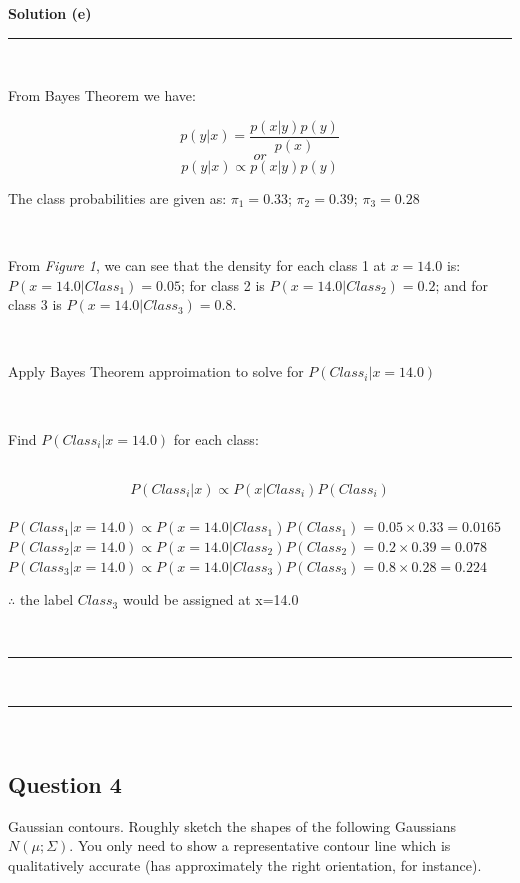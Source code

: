 \documentclass{article}
\begin{document}
\parbox{\textwidth}{\textbf{Solution (e)}}
\noindent\rule{\textwidth}{0.4pt}\\

\parbox{\textwidth}{From Bayes Theorem we have:}
$$p(y|x) = \frac{p(x|y)p(y)}{p(x)}$$
$$or$$
$$p(y|x) \propto p(x|y)p(y)$$

\parbox{\textwidth}{The class probabilities are given as: $\pi_1 = 0.33$; $\pi_2 = 0.39$; $\pi_3 = 0.28$}\\

\parbox{\textwidth}{From \textit{Figure 1}, we can see that the density for each class 1 at $x=14.0$ is: $P(x=14.0|Class_1) = 0.05$; for class 2 is $P(x=14.0|Class_2) = 0.2$; and for class 3 is $P(x=14.0|Class_3) = 0.8$.}\\

\parbox{\textwidth}{Apply Bayes Theorem approimation to solve for $P(Class_i | x=14.0)$}\\

\parbox{\textwidth}{Find $P(Class_i|x=14.0)$ for each class:}\\

$$P(Class_i|x) \propto P(x|Class_i)P(Class_i)$$\\

$P(Class_1|x=14.0) \propto P(x=14.0|Class_1)P(Class_1) = 0.05 \times 0.33 = 0.0165$\\

$P(Class_2|x=14.0) \propto P(x=14.0|Class_2)P(Class_2) = 0.2 \times 0.39 = 0.078$\\

$P(Class_3|x=14.0) \propto P(x=14.0|Class_3)P(Class_3) = 0.8 \times 0.28 = 0.224$\\

\parbox{\textwidth}{$\therefore$ the label $Class_3$ would be assigned at x=14.0}\\

\noindent\rule{\textwidth}{0.4pt}\\

\noindent\rule{\textwidth}{0.4pt}\\

\newpage

\subsection*{Question 4}

\parbox{\textwidth}{Gaussian contours. Roughly sketch the shapes of the following Gaussians $N(\mu; \Sigma)$. You only need to show a representative contour line which is qualitatively accurate (has approximately the right orientation, for instance).}\\
\end{document}
